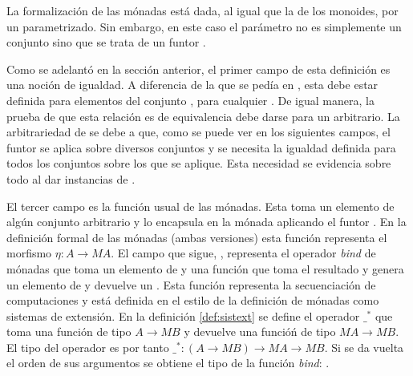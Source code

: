 La formalización de las mónadas está dada, al igual que la de los monoides, por un  parametrizado. Sin embargo, en este caso el parámetro no es simplemente un conjunto sino que se trata de un funtor  \AgdaSymbol{:}  \AgdaSymbol{$\rightarrow$} . 


Como se adelantó en la sección anterior, el primer campo de esta definición es una noción de igualdad. A diferencia de la que se pedía en , esta debe estar definida para elementos del conjunto , para cualquier . De igual manera, la prueba de que esta relación es de equivalencia debe darse para un  arbitrario. La arbitrariedad de  se debe a que, como se puede ver en los siguientes campos, el funtor  se aplica sobre diversos conjuntos y se necesita la igualdad definida para todos los conjuntos sobre los que  se aplique. Esta necesidad se evidencia sobre todo al dar instancias de .

El tercer campo es la función  usual de las mónadas. Esta toma un elemento de algún conjunto  arbitrario y lo encapsula en la mónada aplicando el funtor . En la definición formal de las mónadas (ambas versiones) esta función representa el morfismo $\eta : A \rightarrow \mathit{M} A$. El campo que sigue, \AgdaField{$\_\gg=\_$}, representa el operador \textit{bind} de mónadas que toma un elemento de  y una función que toma el resultado  y genera un elemento de  y devuelve un . Esta función representa la secuenciación de computaciones y está definida en el estilo de la definición de mónadas como sistemas de extensión. En la definición \ref{def:sistext} se define el operador $\_^*$ que toma una función de tipo $A \rightarrow \mathit{M} B$ y devuelve una funcióń de tipo $\mathit{M} A \rightarrow \mathit{M} B$. El tipo del operador es por tanto $\_^* : (A \rightarrow \mathit{M} B) \rightarrow \mathit{M} A \rightarrow \mathit{M} B$. Si se da vuelta el orden de sus argumentos se obtiene el tipo de la función \textit{bind}: \AgdaField{$\_\gg=\_$} \AgdaSymbol{:}  \AgdaSymbol{$\rightarrow$} \AgdaSymbol{(} \AgdaSymbol{$\rightarrow$} \AgdaSymbol{) $\rightarrow$} . 

